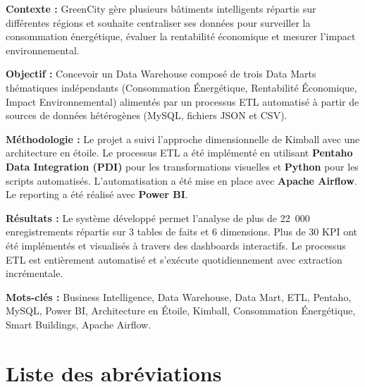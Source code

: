 \documentclass[12pt,a4paper]{report}
\begin{document}
\textbf{Contexte :} GreenCity gère plusieurs bâtiments intelligents répartis sur différentes régions et souhaite centraliser ses données pour surveiller la consommation énergétique, évaluer la rentabilité économique et mesurer l'impact environnemental.

\textbf{Objectif :} Concevoir un Data Warehouse composé de trois Data Marts thématiques indépendants (Consommation Énergétique, Rentabilité Économique, Impact Environnemental) alimentés par un processus ETL automatisé à partir de sources de données hétérogènes (MySQL, fichiers JSON et CSV).

\textbf{Méthodologie :} Le projet a suivi l'approche dimensionnelle de Kimball avec une architecture en étoile. Le processus ETL a été implémenté en utilisant \textbf{Pentaho Data Integration (PDI)} pour les transformations visuelles et \textbf{Python} pour les scripts automatisés. L'automatisation a été mise en place avec \textbf{Apache Airflow}. Le reporting a été réalisé avec \textbf{Power BI}.

\textbf{Résultats :} Le système développé permet l'analyse de plus de 22~000 enregistrements répartis sur 3 tables de faits et 6 dimensions. Plus de 30 KPI ont été implémentés et visualisés à travers des dashboards interactifs. Le processus ETL est entièrement automatisé et s'exécute quotidiennement avec extraction incrémentale.

\textbf{Mots-clés :} Business Intelligence, Data Warehouse, Data Mart, ETL, Pentaho, MySQL, Power BI, Architecture en Étoile, Kimball, Consommation Énergétique, Smart Buildings, Apache Airflow.

\cleardoublepage


\tableofcontents
\cleardoublepage

\listoffigures
\cleardoublepage

\listoftables
\cleardoublepage


\chapter*{Liste des abréviations}
\end{document}
